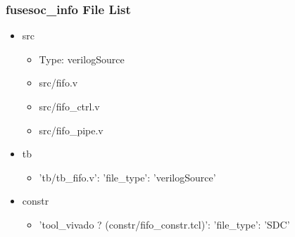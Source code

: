 \subsubsection{fusesoc\_info File List}
\begin{itemize}
\item src
	\begin{itemize}
	\item[$\space$] Type: verilogSource
	\item src/fifo.v
	\item src/fifo\_ctrl.v
	\item src/fifo\_pipe.v
	\end{itemize}
\item tb
	\begin{itemize}
	\item {'tb/tb\_fifo.v': {'file\_type': 'verilogSource'}}
	\end{itemize}
\item constr
	\begin{itemize}
	\item {'tool\_vivado ? (constr/fifo\_constr.tcl)': {'file\_type': 'SDC'}}
	\end{itemize}
\end{itemize}
